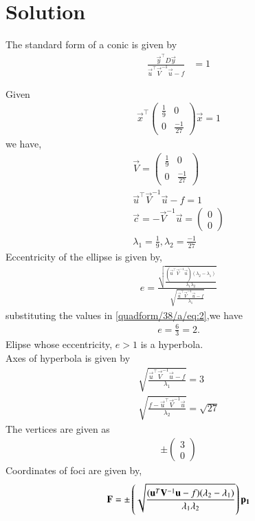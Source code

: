 \documentclass[journal,12pt,twocolumn]{IEEEtran}
\newcommand{\myvec}[1]{\ensuremath{\begin{pmatrix}#1\end{pmatrix}}}
\begin{document}
\section{Solution}
\begin{enumerate}
\begin{lemma}
The standard form of a conic is given by
\begin{align}
\frac{\vec{y}^{\top}D\vec{y}}{\vec{u}^{\top}\vec{V}^{-1}\vec{u}-f}&=1
\end{align}
\end{lemma}
Given
\begin{align}
\vec{x}^{\top}\myvec{\frac{1}{9} & 0 \\ 0 &\frac{-1}{27} }\vec{x}=1  
\end{align}
we have,
\begin{align}
    \vec{V} = \myvec{\frac{1}{9} & 0 \\ 0 &\frac{-1}{27} }
    \\
    \vec{u}^{\top}\vec{V}^{-1}\vec{u}-f = 1
    \\
    \vec{c} = -\vec{V}^{-1}\vec{u}=\myvec{0 \\ 0}
    \\
    \lambda_1 =  \frac{1}{9}, \lambda_2 = \frac{-1}{27}
\end{align}
Eccentricity of the ellipse is given by,
\begin{align}
   e = \frac{\sqrt{\frac{(\vec{u}^{\top}\vec{V}^{-1}\vec{u})(\lambda_2-\lambda_1)}{\lambda_1\lambda_2}}}{\sqrt{\frac{\vec{u}^{\top}\vec{V}^{-1}\vec{u}-f}{\lambda_1}}} \label{quadform/38/a/eq:2}
\end{align}
substituting the values in \eqref{quadform/38/a/eq:2},we have
\begin{align}
   e = \frac{6}{3}= 2.
\end{align}
Elipse whose eccentricity, $e>1$ is a hyperbola.
\\
Axes of hyperbola is given by
\begin{align}
    \sqrt{\frac{\vec{u}^{\top}\vec{V}^{-1}\vec{u}-f}{\lambda_1}} = 3\\ \sqrt{\frac{f-\vec{u}^{\top}\vec{V}^{-1}\vec{u}}{\lambda_2}} = \sqrt{27}
\end{align}
The vertices are given as
\begin{align}
    \pm\myvec{3\\ 0}
\end{align}
Coordinates of foci are given by,
\begin{align}
  \vec{F} =\pm\brak{\sqrt{\frac{(\vec{u}^T\vec{V}^{-1}\vec{u}-f)(\lambda_2-\lambda_1)}{\lambda_1\lambda_2}}}\vec{p_1} \label{quadform/38/a/eq:1}

\end{align}
\end{enumerate}
\end{document}
